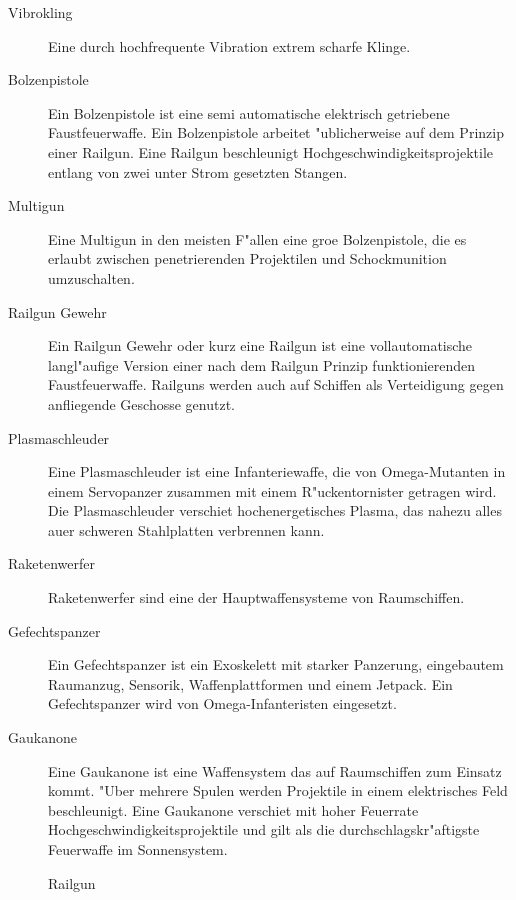 \begin{description}
\item [Vibrokling] Eine durch hochfrequente Vibration extrem scharfe Klinge.
\item [Bolzenpistole] Ein Bolzenpistole ist eine semi automatische elektrisch getriebene Faustfeuerwaffe. Ein Bolzenpistole arbeitet "ublicherweise auf  
      dem Prinzip einer Railgun. Eine Railgun beschleunigt Hochgeschwindigkeitsprojektile entlang von zwei unter Strom gesetzten Stangen.
\item [Multigun] Eine Multigun in den meisten F"allen eine gro\3e Bolzenpistole, die es erlaubt zwischen     
      penetrierenden Projektilen und Schockmunition umzuschalten.
\item [Railgun Gewehr] Ein Railgun Gewehr oder kurz eine Railgun ist eine vollautomatische langl"aufige Version einer nach 
      dem Railgun Prinzip funktionierenden Faustfeuerwaffe. Railguns werden auch auf Schiffen als Verteidigung gegen anfliegende Geschosse genutzt.         
\item [Plasmaschleuder] Eine Plasmaschleuder ist eine Infanteriewaffe, die von Omega-Mutanten in einem Servopanzer zusammen mit
      einem R"uckentornister getragen wird. Die Plasmaschleuder verschie\3t hochenergetisches Plasma, das nahezu alles au\3er schweren Stahlplatten verbrennen kann.
\item [Raketenwerfer] Raketenwerfer sind eine der Hauptwaffensysteme von Raumschiffen.      
\item [Gefechtspanzer] Ein Gefechtspanzer ist ein Exoskelett mit starker Panzerung, eingebautem Raumanzug, Sensorik,
      Waffenplattformen und einem Jetpack. Ein Gefechtspanzer wird von Omega-Infanteristen eingesetzt.
\item [Gau\3kanone] Eine Gau\3kanone ist eine Waffensystem das auf Raumschiffen zum Einsatz kommt. "Uber mehrere Spulen
      werden Projektile in einem elektrisches Feld beschleunigt. Eine Gau\3kanone verschie\3t mit hoher Feuerrate Hochgeschwindigkeitsprojektile und gilt als die durchschlagskr"aftigste Feuerwaffe im Sonnensystem.         
\end{description}

\begin{figure}[htbp]
      \centering
      \newline{}Railgun
      \label{fig:rail-gun}
\end{figure}

